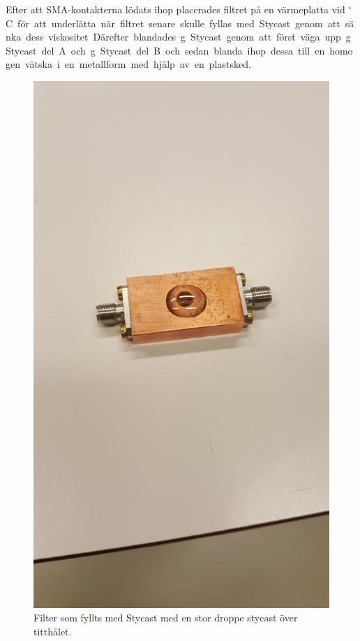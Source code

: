 \documentclass[main.tex]{subfiles}
\begin{document}
Efter att SMA-kontakterna lödats ihop placerades filtret på en värmeplatta vid \unit[40]{$^\circ$C} för att underlätta när filtret senare skulle fyllas med Stycast genom att sänka dess viskositet. Därefter blandades \unit[12,8]{g} Stycast genom att först väga upp \unit[10]{g} Stycast del A och \unit[2,8]{g} Stycast del B och sedan blanda ihop dessa till en homogen vätska i en metallform med hjälp av en plastsked. 

\begin{figure}
    \centering
    \includegraphics[angle=-90,trim=1250 200 1950 200,clip,width=0.975\linewidth]{figure/Filterbilder/stycast_fill.jpg}
    \caption{Filter som fyllts med Stycast med en stor droppe stycast över titthålet.}
    \label{fig:stycast_filled}
\end{figure}
\end{document}

